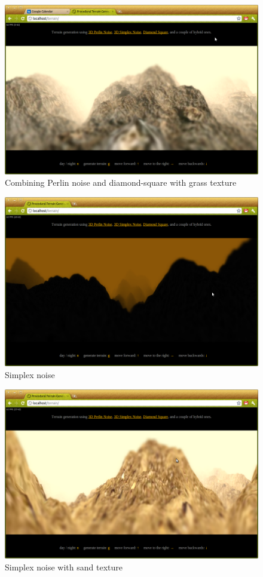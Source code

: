 \begin{figure}
	\center
	\includegraphics[scale=0.4]{images/demo_2_1.png}
	\caption{Combining Perlin noise and diamond-square with grass texture}
	\label{fig:demo_2_1}
\end{figure}
\begin{figure}
	\center
	\includegraphics[scale=0.4]{images/demo_3_0.png}
	\caption{Simplex noise}
	\label{fig:demo_3_0}
\end{figure}
\begin{figure}
	\center
	\includegraphics[scale=0.4]{images/demo_3_2.png}
	\caption{Simplex noise with sand texture}
	\label{fig:demo_3_2}
\end{figure}
